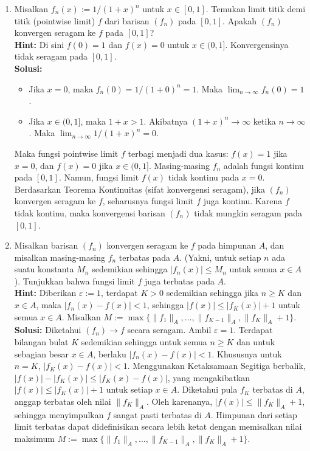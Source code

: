 ﻿\documentclass{article}
\begin{document}
\begin{enumerate}
        \vspace{0.5cm}
  \item[6.] Misalkan $f_n(x) := 1 / (1 + x)^n$ untuk $x \in [0, 1]$. Temukan limit titik demi titik (pointwise limit) $f$ dari barisan $(f_n)$ pada $[0, 1]$. Apakah $(f_n)$ konvergen seragam ke $f$ pada $[0, 1]$?\\
        \textbf{Hint:} Di sini $f(0) = 1$ dan $f(x) = 0$ untuk $x \in (0, 1]$. Konvergensinya tidak seragam pada $[0, 1]$.\\
        \textbf{Solusi:}
        \begin{itemize}
          \item Jika $x = 0$, maka $f_n(0) = 1 / (1+0)^n = 1$. Maka $\lim_{n \to \infty} f_n(0) = 1$.
          \item Jika $x \in (0, 1]$, maka $1+x > 1$. Akibatnya $(1+x)^n \to \infty$ ketika $n \to \infty$. Maka $\lim_{n \to \infty} 1 / (1+x)^n = 0$.
        \end{itemize}
        Maka fungsi pointwise limit $f$ terbagi menjadi dua kasus: $f(x) = 1$ jika $x = 0$, dan $f(x) = 0$ jika $x \in (0, 1]$.
        Masing-masing $f_n$ adalah fungsi kontinu pada $[0, 1]$. Namun, fungsi limit $f(x)$ tidak kontinu pada $x = 0$. Berdasarkan Teorema Kontinuitas (sifat konvergensi seragam), jika $(f_n)$ konvergen seragam ke $f$, seharusnya fungsi limit $f$ juga kontinu. Karena $f$ tidak kontinu, maka konvergensi barisan $(f_n)$ tidak mungkin seragam pada $[0, 1]$.

        \vspace{0.5cm}
  \item[7.] Misalkan barisan $(f_n)$ konvergen seragam ke $f$ pada himpunan $A$, dan misalkan masing-masing $f_n$ terbatas pada $A$. (Yakni, untuk setiap $n$ ada suatu konstanta $M_n$ sedemikian sehingga $|f_n(x)| \le M_n$ untuk semua $x \in A$). Tunjukkan bahwa fungsi limit $f$ juga terbatas pada $A$.\\
        \textbf{Hint:} Diberikan $\varepsilon := 1$, terdapat $K > 0$ sedemikian sehingga jika $n \ge K$ dan $x \in A$, maka $|f_n(x) - f(x)| < 1$, sehingga $|f(x)| \le |f_K(x)| + 1$ untuk semua $x \in A$. Misalkan $M := \max\{\|f_1\|_A, \dots, \|f_{K-1}\|_A, \|f_K\|_A + 1\}$.\\
        \textbf{Solusi:}
        Diketahui $(f_n) \to f$ secara seragam. Ambil $\varepsilon = 1$. Terdapat bilangan bulat $K$ sedemikian sehingga untuk semua $n \ge K$ dan untuk sebagian besar $x \in A$, berlaku $|f_n(x) - f(x)| < 1$. Khususnya untuk $n = K$, $|f_K(x) - f(x)| < 1$.
        Menggunakan Ketaksamaan Segitiga berbalik, $|f(x)| - |f_K(x)| \le |f_K(x) - f(x)|$, yang mengakibatkan $|f(x)| \le |f_K(x)| + 1$ untuk setiap $x \in A$.
        Diketahui pula $f_K$ terbatas di $A$, anggap terbatas oleh nilai $\|f_K\|_A$. Oleh karenanya, $|f(x)| \le \|f_K\|_A + 1$, sehingga menyimpulkan $f$ sangat pasti terbatas di $A$. Himpunan dari setiap limit terbatas dapat didefinisikan secara lebih ketat dengan memisalkan nilai maksimum $M := \max\{\|f_1\|_A, \dots, \|f_{K-1}\|_A, \|f_K\|_A + 1\}$.


\end{enumerate}
\end{document}
